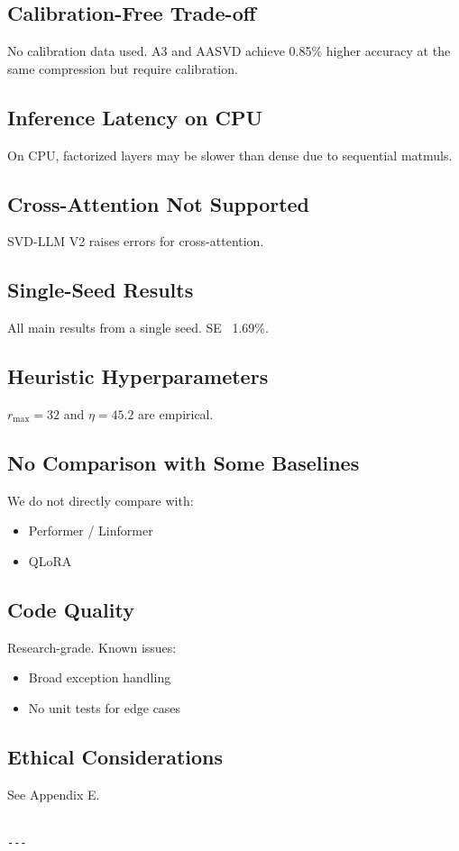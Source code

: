 \subsection{Calibration-Free Trade-off}

No calibration data used. A3 and AASVD achieve 0.85\% higher accuracy 
at the same compression but require calibration.

\subsection{Inference Latency on CPU}

On CPU, factorized layers may be slower than dense due to sequential matmuls.

\subsection{Cross-Attention Not Supported}

SVD-LLM V2 raises errors for cross-attention.

\subsection{Single-Seed Results}

All main results from a single seed. SE ~1.69\%.

\subsection{Heuristic Hyperparameters}

$r_\text{max} = 32$ and $\eta = 45.2$ are empirical.

\subsection{No Comparison with Some Baselines}

We do not directly compare with:
\begin{itemize}
\item Performer / Linformer
\item QLoRA

\end{itemize}
\subsection{Code Quality}

Research-grade. Known issues:
\begin{itemize}
\item Broad exception handling
\item No unit tests for edge cases

\end{itemize}
\subsection{Ethical Considerations}

See Appendix E.
\begin{lstlisting}

---
\end{lstlisting}